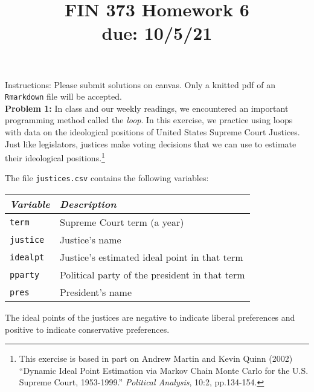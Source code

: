 \documentclass[11pt]{article}
\begin{document}
\title{FIN 373 Homework 6 \\ {\large due: \textbf{10/5/21}}}
\date{}
\maketitle

\vspace{-20mm}

\noindent Instructions: Please submit solutions on canvas.  Only a knitted pdf of an {\tt Rmarkdown} file will be accepted.
\\

\noindent \textbf{Problem 1:} In class and our weekly readings, we encountered an important programming method called the \textit{loop}.
In this exercise, we practice using loops 
with data on the ideological positions of United States
Supreme Court Justices.  Just like legislators, justices make voting decisions 
that we can use to estimate their ideological positions.\footnote{This exercise is based in part on Andrew Martin and Kevin Quinn (2002) ``Dynamic
  Ideal Point Estimation via Markov Chain Monte Carlo for the
  U.S. Supreme Court, 1953-1999.'' \textit{Political Analysis}, 10:2, pp.134-154.}
  
  
The file {\tt justices.csv} contains the following variables:

\vspace{1mm}
\begin{center}
\begin{tabular}{l p{8cm}}
 \hline
\textit{Variable} & \textit{Description} \\
\hline
{\tt term} &               Supreme Court term (a year) \\
{\tt justice} &            Justice's name \\
{\tt idealpt} &           Justice's estimated ideal point in that term \\
{\tt pparty} &             Political party of the president in that term \\
{\tt pres} &               President's name \\
\hline
\end{tabular}
\end{center}

The ideal points of the justices are negative to indicate liberal 
preferences and positive to indicate conservative preferences. 
\end{document}
